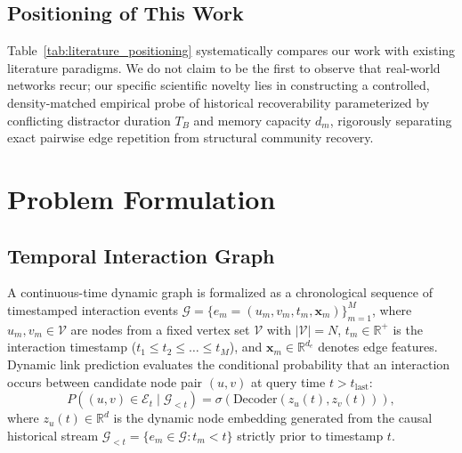 \documentclass[10pt,twocolumn,letterpaper]{article}
\begin{document}
\subsection{Positioning of This Work}
Table~\ref{tab:literature_positioning} systematically compares our work with existing literature paradigms. We do not claim to be the first to observe that real-world networks recur; our specific scientific novelty lies in constructing a controlled, density-matched empirical probe of historical recoverability parameterized by conflicting distractor duration $T_B$ and memory capacity $d_m$, rigorously separating exact pairwise edge repetition from structural community recovery.

\section{Problem Formulation}
\label{sec:problem_formulation}

\subsection{Temporal Interaction Graph}
A continuous-time dynamic graph is formalized as a chronological sequence of timestamped interaction events $\mathcal{G} = \{e_m = (u_m, v_m, t_m, \mathbf{x}_m)\}_{m=1}^M$, where $u_m, v_m \in \mathcal{V}$ are nodes from a fixed vertex set $\mathcal{V}$ with $|\mathcal{V}| = N$, $t_m \in \mathbb{R}^+$ is the interaction timestamp ($t_1 \le t_2 \le \dots \le t_M$), and $\mathbf{x}_m \in \mathbb{R}^{d_e}$ denotes edge features. Dynamic link prediction evaluates the conditional probability that an interaction occurs between candidate node pair $(u, v)$ at query time $t > t_{\text{last}}$:
\begin{equation}
    P((u, v) \in \mathcal{E}_{t} \mid \mathcal{G}_{< t}) = \sigma(\text{Decoder}(z_u(t), z_v(t))),
\end{equation}
where $z_u(t) \in \mathbb{R}^d$ is the dynamic node embedding generated from the causal historical stream $\mathcal{G}_{< t} = \{e_m \in \mathcal{G} : t_m < t\}$ strictly prior to timestamp $t$.
\end{document}
